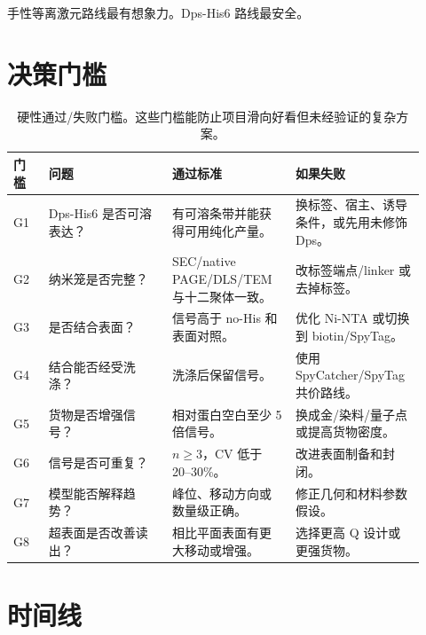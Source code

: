 \documentclass[11pt]{ctexart}
\begin{document}
手性等离激元路线最有想象力。Dps-His6 路线最安全。

\section{决策门槛}

\begin{table}[H]
\centering
\small
\begin{tabular}{p{0.08\linewidth}p{0.29\linewidth}p{0.29\linewidth}p{0.26\linewidth}}
\toprule
门槛 & 问题 & 通过标准 & 如果失败 \\
\midrule
G1 & Dps-His6 是否可溶表达？ & 有可溶条带并能获得可用纯化产量。 & 换标签、宿主、诱导条件，或先用未修饰 Dps。 \\
G2 & 纳米笼是否完整？ & SEC/native PAGE/DLS/TEM 与十二聚体一致。 & 改标签端点/linker 或去掉标签。 \\
G3 & 是否结合表面？ & 信号高于 no-His 和表面对照。 & 优化 Ni-NTA 或切换到 biotin/SpyTag。 \\
G4 & 结合能否经受洗涤？ & 洗涤后保留信号。 & 使用 SpyCatcher/SpyTag 共价路线。 \\
G5 & 货物是否增强信号？ & 相对蛋白空白至少 5 倍信号。 & 换成金/染料/量子点或提高货物密度。 \\
G6 & 信号是否可重复？ & $n \ge 3$，CV 低于 20--30\%。 & 改进表面制备和封闭。 \\
G7 & 模型能否解释趋势？ & 峰位、移动方向或数量级正确。 & 修正几何和材料参数假设。 \\
G8 & 超表面是否改善读出？ & 相比平面表面有更大移动或增强。 & 选择更高 Q 设计或更强货物。 \\
\bottomrule
\end{tabular}
\caption{硬性通过/失败门槛。这些门槛能防止项目滑向好看但未经验证的复杂方案。}
\label{tab:gates-cn}
\end{table}

\section{时间线}
\end{document}
